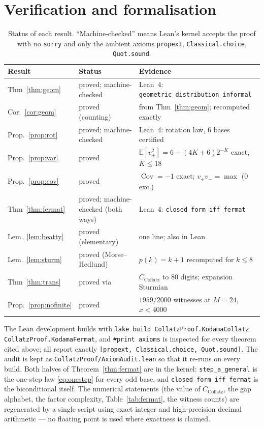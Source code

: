 \documentclass[11pt,a4paper]{article}
\theoremstyle{plain}
\theoremstyle{definition}
\newcommand{\CC}{C_{\mathrm{Collatz}}}
\begin{document}
\section{Verification and formalisation}\label{sec:verif}

\begin{table}[ht]\centering
\small
\begin{tabular}{@{}l l l@{}}
\toprule
Result & Status & Evidence\\\midrule
Thm~\ref{thm:geom} & proved; machine-checked &
  Lean~4: \texttt{geometric\_distribution\_informal}\\
Cor.~\ref{cor:geom} & proved (counting) & from Thm~\ref{thm:geom}; recomputed exactly\\
Prop.~\ref{prop:rot} & proved; machine-checked & Lean~4: rotation law, $6$ bases certified\\
Prop.~\ref{prop:var} & proved & $\mathbb{E}[v_{+}^{2}]=6-(4K+6)2^{-K}$ exact, $K\le18$\\
Prop.~\ref{prop:cov} & proved & $\operatorname{Cov}=-1$ exact; $v_{+}v_{-}=\max$ ($0$ exc.)\\
Thm~\ref{thm:fermat} & proved; machine-checked (both ways) &
  Lean~4: \texttt{closed\_form\_iff\_fermat}\\
Lem.~\ref{lem:beatty} & proved (elementary) & one line; also in Lean\\
Lem.~\ref{lem:sturm} & proved (Morse--Hedlund) & $p(k)=k+1$ recomputed for $k\le8$\\
Thm~\ref{thm:trans} & proved via \cite{fm,ab} & $\CC$ to $80$ digits; expansion Sturmian\\
Prop.~\ref{prop:nofinite} & proved & $1959/2000$ witnesses at $M=24$, $x<4000$\\
\bottomrule
\end{tabular}
\caption{Status of each result. ``Machine-checked'' means Lean's kernel accepts the proof
with no \texttt{sorry} and only the ambient axioms \texttt{propext},
\texttt{Classical.choice}, \texttt{Quot.sound}.}
\end{table}

The Lean development builds with \texttt{lake build CollatzProof.KodamaCollatz
CollatzProof.KodamaFermat}, and \texttt{\#print axioms} is inspected for every theorem cited
above; all report exactly \texttt{[propext, Classical.choice, Quot.sound]}. The audit is kept
as \texttt{CollatzProof/AxiomAudit.lean} so that it re-runs on every build. Both halves of
Theorem~\ref{thm:fermat} are in the kernel: \texttt{step\_a\_general} is the one-step law
\eqref{eq:onestep} for every odd base, and \texttt{closed\_form\_iff\_fermat} is the
biconditional itself. The numerical statements (the value of $\CC$, the gap alphabet, the
factor complexity, Table~\ref{tab:fermat}, the witness counts) are regenerated by a single
script using exact integer and high-precision decimal arithmetic --- no floating point is used
where exactness is claimed.
\end{document}
